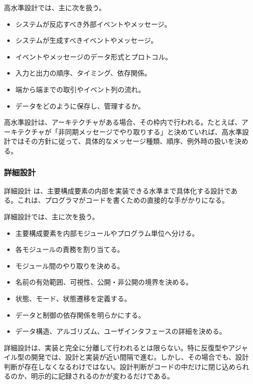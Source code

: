 高水準設計では、主に次を扱う。
\begin{itemize}
  \item システムが反応すべき外部イベントやメッセージ。
  \item システムが生成すべきイベントやメッセージ。
  \item イベントやメッセージのデータ形式とプロトコル。
  \item 入力と出力の順序、タイミング、依存関係。
  \item 端から端までの取引やイベント列の流れ。
  \item データをどのように保存し、管理するか。
\end{itemize}

高水準設計は、アーキテクチャがある場合、その枠内で行われる。たとえば、アーキテクチャが「非同期メッセージでやり取りする」と決めていれば、高水準設計ではその方針に従って、具体的なメッセージ種類、順序、例外時の扱いを決める。

\subsubsection{詳細設計}

詳細設計 は、主要構成要素の内部を実装できる水準まで具体化する設計である。これは、プログラマがコードを書くための直接的な手がかりになる。

詳細設計では、主に次を扱う。
\begin{itemize}
  \item 主要構成要素を内部モジュールやプログラム単位へ分ける。
  \item 各モジュールの責務を割り当てる。
  \item モジュール間のやり取りを決める。
  \item 名前の有効範囲、可視性、公開・非公開の境界を決める。
  \item 状態、モード、状態遷移を定義する。
  \item データと制御の依存関係を明らかにする。
  \item データ構造、アルゴリズム、ユーザインタフェースの詳細を決める。
\end{itemize}

詳細設計は、実装と完全に分離して行われるとは限らない。特に反復型やアジャイル型の開発では、設計と実装が近い間隔で進む。しかし、その場合でも、設計判断が存在しなくなるわけではない。設計判断がコードの中だけに閉じ込められるのか、明示的に記録されるのかが変わるだけである。
